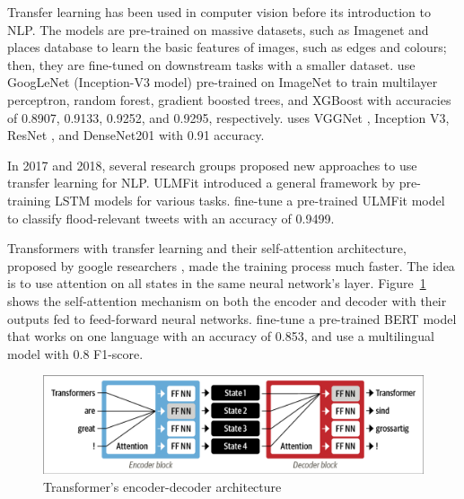 Transfer learning has been used in computer vision before its introduction to \ac{NLP}. The models
are pre-trained on massive datasets, such as Imagenet
\cite{krizhevskyImageNetClassificationDeep2017} and places database
\cite{zhouLearningDeepFeatures2014} to learn the basic features of images, such as edges and
colours; then, they are fine-tuned on downstream tasks with a smaller dataset.
 use GoogLeNet (Inception-V3 model) \cite{7780677}
pre-trained on ImageNet to train multilayer perceptron, random forest, gradient boosted trees, and
XGBoost with accuracies of 0.8907, 0.9133, 0.9252, and 0.9295, respectively.
 uses VGGNet \cite{simonyanVeryDeepConvolutional2015},
Inception V3, ResNet \cite{heDeepResidualLearning2015}, and DenseNet201
\cite{huangDenselyConnectedConvolutional2018} with 0.91 accuracy.

In 2017 and 2018, several research groups proposed new approaches to use transfer learning for
\ac{NLP}. \ac{ULMFit} \cite{howardUniversalLanguageModel2018} introduced a general framework by
pre-training \ac{LSTM} models for various tasks.
 fine-tune a pre-trained \ac{ULMFit} model
to classify flood-relevant tweets with an accuracy of 0.9499. 

Transformers with transfer learning and their self-attention architecture, proposed by google
researchers \cite{vaswaniAttentionAllYou2017}, made the training process much faster. The idea is to
use attention on all states in the same neural network's layer.
Figure~\ref{fig:encoder_decoder_transformer} shows the self-attention mechanism on both the encoder
and decoder with their outputs fed to feed-forward neural networks.
 fine-tune a pre-trained \ac{BERT}
\cite{devlinBERTPretrainingDeep2019}  model that works on one language with an accuracy of 0.853,
and  use a multilingual model with 0.8 F1-score.

\begin{figure}[H]
\begin{center}
  \includegraphics[width=12cm, trim={0.1cm 0.1cm 0.1cm 0.1cm},clip]{./images/encoder-decoder_transformer.png}
\end{center}
\caption{Transformer's encoder-decoder architecture \cite{tunstallNaturalLanguageProcessing2022}}
\label{fig:encoder_decoder_transformer}
\end{figure}


